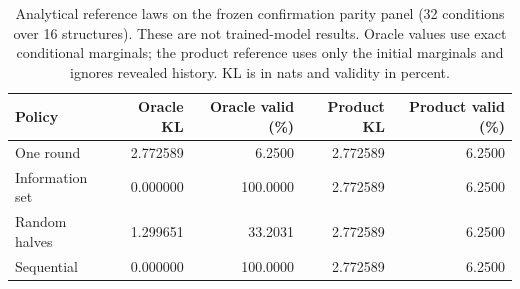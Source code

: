 \begin{table}[ht]
\centering\small
\caption{Analytical reference laws on the frozen confirmation parity panel (32 conditions over 16 structures). These are not trained-model results. Oracle values use exact conditional marginals; the product reference uses only the initial marginals and ignores revealed history. KL is in nats and validity in percent.}
\label{tab:confirmationoracle}
\begin{tabular}{lrrrr}
\toprule
Policy & Oracle KL & Oracle valid (\%) & Product KL & Product valid (\%) \\
\midrule
One round & 2.772589 & 6.2500 & 2.772589 & 6.2500 \\
Information set & 0.000000 & 100.0000 & 2.772589 & 6.2500 \\
Random halves & 1.299651 & 33.2031 & 2.772589 & 6.2500 \\
Sequential & 0.000000 & 100.0000 & 2.772589 & 6.2500 \\
\bottomrule
\end{tabular}
\end{table}
